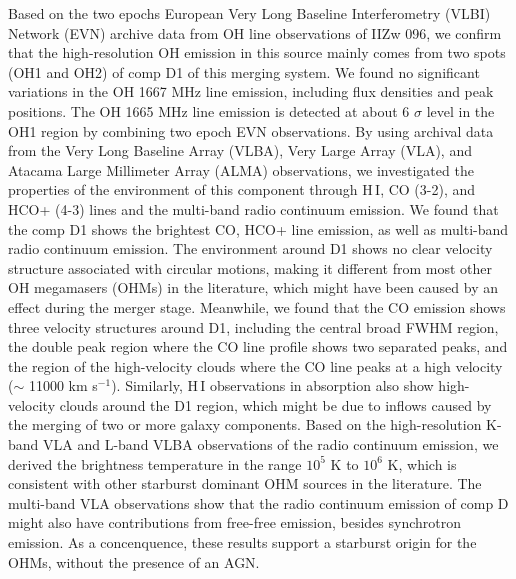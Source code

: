 \documentclass[]{aa} %
\newcommand{\kms}{km s$^{-1}$\xspace}
\newcommand{\HI}{{\rm H\,{\scriptsize I}}\xspace}
\begin{document}
  \abstract
   {
   Based on the two epochs European Very Long Baseline Interferometry (VLBI) Network (EVN) archive data from OH line observations of IIZw 096, we confirm that the high-resolution OH emission in this source mainly comes from two spots (OH1 and OH2) of comp D1 of this merging system. We found no significant variations in the OH 1667 MHz line emission, including flux densities and peak positions. The OH 1665 MHz line emission is detected at about 6 $\sigma$ level in the OH1 region by combining two epoch EVN observations. By using archival data from the Very Long Baseline Array (VLBA), Very Large Array (VLA), and Atacama Large Millimeter Array (ALMA) observations, we investigated the properties of the environment of this component through \HI, CO (3-2), and HCO+ (4-3) lines and the multi-band radio continuum emission. We found that the comp D1 shows the brightest CO, HCO+ line emission, as well as multi-band radio continuum emission. The environment around D1 shows no clear velocity structure associated with circular motions, making it different from most other OH megamasers (OHMs) in the literature, which might have been caused by an effect during the merger stage. Meanwhile, we found that the CO emission shows three velocity structures around D1, including the central broad FWHM region, the double peak region where the CO line profile shows two separated peaks, and the region of the high-velocity clouds where the CO line peaks at a high velocity ($\sim$ 11000 \kms). Similarly, \HI observations in absorption also show high-velocity clouds around the D1 region, which might be due to inflows caused by the merging of two or more galaxy components. Based on the high-resolution K-band VLA and L-band VLBA observations of the radio continuum emission, we derived the brightness temperature in the range $10^{5}$ K to $10^{6}$ K, which is consistent with other starburst dominant OHM sources in the literature. The multi-band VLA observations show that the radio continuum emission of comp D might also have contributions from free-free emission, besides synchrotron emission. As a concenquence, these results support a starburst origin for the OHMs, without the presence of an AGN.
  }
\end{document}
